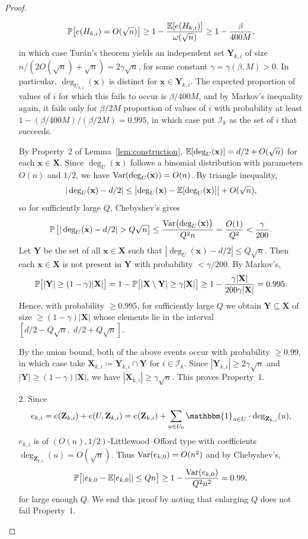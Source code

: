 \begin{proof}
\begin{enumerate}
    \[
      \prob\bigl[e(H_{k, i}) = O(\sqrt{n})\bigr] \geq 1 - \frac{\E[e(H_{k, i})]}{\omega(\sqrt{n})} \geq 1 - \frac{\beta}{400M},
    \]
    in which case Tur\'{a}n's theorem yields an independent set $\mathbf{Y}_{k, i}$ of size $n/(2O(\sqrt{n}) + \sqrt{n}) = 2\gamma \sqrt{n}$, for some constant $\gamma = \gamma(\beta, M) > 0$. In particular, $\deg_{U_{k, i}}(\mathbf{x})$ is distinct for $\mathbf{x} \in \mathbf{Y}_{k, i}$. The expected proportion of values of $i$ for which this fails to occur is $\beta/400M$, and by Markov's inequality again, it fails only for $\beta/2M$ proportion of values of $i$ with probability at least $1 - (\beta/400M)/(\beta/2M) = 0.995$, in which case put $\mathcal{I}_k$ as the set of $i$ that succeeds.

    By Property~2 of Lemma~\ref{lem:construction}, $\E[\deg_U(\mathbf{x})] = d/2 + O(\sqrt{n})$ for each $\mathbf{x} \in \mathbf{X}$. Since $\deg_U(\mathbf{x})$ follows a binomial distribution with parameters $O(n)$ and $1/2$, we have $\Var(\deg_U(\mathbf{x})) = O(n)$. By triangle inequality, 
    \[
      |\deg_U(\mathbf{x}) - d/2| \leq \bigl|\deg_U(\mathbf{x}) - \E[\deg_U(\mathbf{x})]\bigr| + O(\sqrt{n}),
    \]
    so for sufficiently large $Q$, Chebyshev's gives
    \[
      \prob\left[|\deg_U(\mathbf{x}) - d/2| > Q\sqrt{n}\right] \leq \frac{\Var\bigl(\deg_U(\mathbf{x})\bigr)}{Q^2 n} = \frac{O(1)}{Q^2} < \frac{\gamma}{200}.
    \]
    Let $\mathbf{Y}$ be the set of all $\mathbf{x} \in \mathbf{X}$ such that $|\deg_U(\mathbf{x}) - d/2| \leq Q\sqrt{n}$. Then each $\mathbf{x} \in \mathbf{X}$ is not present in $\mathbf{Y}$ with probability $< \gamma/200$. By Markov's,
    \[
      \prob\bigl[|\mathbf{Y}| \geq (1 - \gamma)|\mathbf{X}|\bigr] = 1 - \prob\bigl[|\mathbf{X} \setminus \mathbf{Y}| \geq \gamma|\mathbf{X}|\bigr] \geq 1 - \frac{\gamma|\mathbf{X}|}{200\gamma |\mathbf{X}|} = 0.995.
    \]
    Hence, with probability $\geq 0.995$, for sufficiently large $Q$ we obtain $\mathbf{Y} \subseteq \mathbf{X}$ of size $\geq (1 - \gamma)|\mathbf{X}|$ whose elements lie in the interval $[d/2 - Q\sqrt{n},\; d/2 + Q\sqrt{n}]$.

    By the union bound, both of the above events occur with probability $\geq 0.99$, in which case take $\mathbf{X}_{k, i} \coloneqq \mathbf{Y}_{k, i} \cap \mathbf{Y}$ for $i \in \mathcal{I}_k$. Since $|\mathbf{Y}_{k, i}| \geq 2\gamma \sqrt{n}$ and $|\mathbf{Y}| \geq (1 - \gamma)|\mathbf{X}|$, we have $|\mathbf{X}_{k, i}| \geq \gamma \sqrt{n}$. This proves Property~1.

    \item[2.] Since
    \[
      e_{k, i} = e(\mathbf{Z}_{k, i}) + e(U, \mathbf{Z}_{k, i}) = e(\mathbf{Z}_{k, i}) + \sum_{u \in U_0} \mathbbm{1}_{u \in U} \cdot \deg_{\mathbf{Z}_{k, i}}(u),
    \]
    $e_{k, i}$ is of $(O(n), 1/2)$-Littlewood--Offord type with coefficients $\deg_{\mathbf{Z}_{k, i}}(u) = O(\sqrt{n})$. Thus $\operatorname{Var}(e_{k, 0}) = O(n^2)$ and by Chebyshev's,
    \[
      \mathbb{P}\bigl[|e_{k, 0} - \mathbb{E}[e_{k, 0}]| \leq Qn\bigr] \geq 1 - \frac{\operatorname{Var}(e_{k, 0})}{Q^2 n^2} = 0.99,
    \]
    for large enough $Q$. We end this proof by noting that enlarging $Q$ does not fail Property~1.
  \end{enumerate}
\end{proof}

